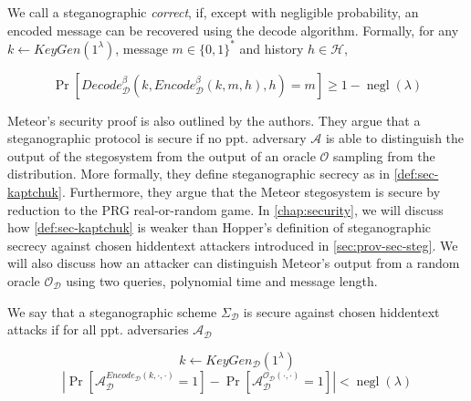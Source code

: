 \begin{definition}
\label{def:correctness-kaptchuk}
We call a steganographic \emph{correct}, if, except with negligible probability, an encoded message can be recovered using the decode algorithm. 
Formally, for any $k \leftarrow KeyGen(1^\lambda)$, message $m \in \{0,1\}^*$ and history $h \in \mathcal{H}$,

$$\mathop{Pr}[Decode_{\mathcal{D}}^\beta(k, Encode_{\mathcal{D}}^\beta(k, m, h), h) = m] \geq 1 - \mathop{negl}(\lambda)$$
\end{definition}

Meteor's security proof is also outlined by the authors.
They argue that a steganographic protocol is secure if no ppt. adversary $\mathcal{A}$ is able to distinguish the output of the stegosystem from the output of an oracle $\mathcal{O}$ sampling from the distribution.
More formally, they define steganographic secrecy as in \autoref{def:sec-kaptchuk}.
Furthermore, they argue that the Meteor stegosystem is secure by reduction to the PRG real-or-random game. 
In \autoref{chap:security}, we will discuss how \autoref{def:sec-kaptchuk} is weaker than Hopper's definition of steganographic secrecy against chosen hiddentext attackers introduced in \autoref{sec:prov-sec-steg}.
We will also discuss how an attacker can distinguish Meteor's output from a random oracle $\mathcal{O}_{\mathcal{D}}$ using two queries, polynomial time and message length.

\begin{definition}%
	\label{def:sec-kaptchuk}%
	We say that a steganographic scheme $\Sigma_{\mathcal{D}}$ is secure against chosen hiddentext attacks if for all ppt. adversaries $\mathcal{A}_{\mathcal{D}}$
	
	$$k \leftarrow KeyGen_{\mathcal{D}}(1^\lambda)$$
	$$\left| \mathop{Pr}\left[ \mathcal{A}_{\mathcal{D}}^{Encode_{\mathcal{D}}(k, \cdot, \cdot)}=1 \right] - \mathop{Pr}\left[ \mathcal{A}_{\mathcal{D}}^{\mathcal{O}_{\mathcal{D}}(\cdot, \cdot)}=1 \right] \right| < \mathop{negl}(\lambda)$$
\end{definition}

